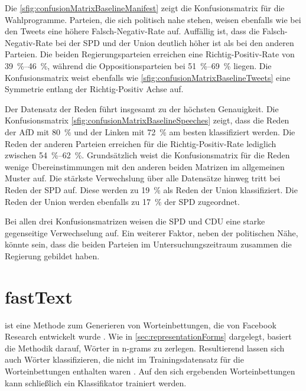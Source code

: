 Die \autoref{sfig:confusionMatrixBaselineManifest} zeigt die Konfusionsmatrix für die Wahlprogramme. Parteien, die sich politisch nahe stehen, weisen ebenfalls wie bei den Tweets eine höhere Falsch-Negativ-Rate auf. Auffällig ist, dass die Falsch-Negativ-Rate bei der \ac{SPD} und der Union deutlich höher ist als bei den anderen Parteien. Die beiden Regierungsparteien erreichen eine Richtig-Positiv-Rate von \SIrange{39}{46}{\percent}, während die Oppositionsparteien bei \SIrange{51}{69}{\percent} liegen. Die Konfusionsmatrix weist ebenfalls wie \autoref{sfig:confusionMatrixBaselineTweets} eine Symmetrie entlang der Richtig-Positiv Achse auf.

Der Datensatz der Reden führt insgesamt zu der höchsten Genauigkeit. Die Konfusionsmatrix \autoref{sfig:confusionMatrixBaselineSpeeches} zeigt, dass die Reden der \ac{AfD} mit \SI{80}{\percent} und der Linken mit \SI{72}{\percent} am besten klassifiziert werden. Die Reden der anderen Parteien erreichen für die Richtig-Positiv-Rate lediglich zwischen \SIrange{54}{62}{\percent}. Grundsätzlich weist die Konfusionsmatrix für die Reden wenige Übereinstimmungen mit den anderen beiden Matrizen im allgemeinen Muster auf. Die stärkste Verwechslung über alle Datensätze hinweg tritt bei Reden der \ac{SPD} auf. Diese werden zu \SI{19}{\percent} als Reden der Union klassifiziert. Die Reden der Union werden ebenfalls zu \SI{17}{\percent} der \ac{SPD} zugeordnet. 

Bei allen drei Konfusionsmatrizen weisen die \ac{SPD} und \ac{CDU} eine starke gegenseitige Verwechselung auf. Ein weiterer Faktor, neben der politischen Nähe, könnte sein, dass die beiden Parteien im Untersuchungszeitraum zusammen die Regierung gebildet haben.

\section{fastText} \label{sec:trainingFastText}

\ft ist eine Methode zum Generieren von Worteinbettungen, die von Facebook Research entwickelt wurde \autocite{joulin_bag_2016}. Wie in \autoref{sec:representationForms} dargelegt, basiert die Methodik darauf, Wörter in n-grams zu zerlegen. Resultierend lassen sich auch Wörter klassifizieren, die nicht im Trainingsdatensatz für die Worteinbettungen enthalten waren \autocite{guhr_training_2020}. Auf den sich ergebenden Worteinbettungen kann schließlich ein Klassifikator trainiert werden.

